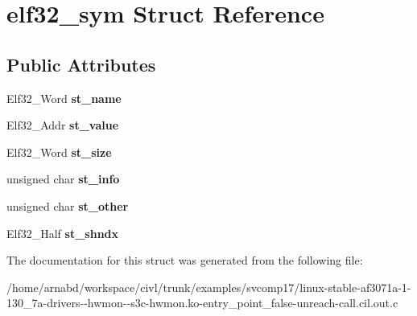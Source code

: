 \hypertarget{structelf32__sym}{}\section{elf32\+\_\+sym Struct Reference}
\label{structelf32__sym}
\subsection*{Public Attributes}
\begin{DoxyCompactItemize}
\item 
\hypertarget{structelf32__sym_a3af4f5f1ead2aefe753e2709ef5218ed}{}Elf32\+\_\+\+Word {\bfseries st\+\_\+name}\label{structelf32__sym_a3af4f5f1ead2aefe753e2709ef5218ed}

\item 
\hypertarget{structelf32__sym_a771991aa716c74feba9c69488c070bbf}{}Elf32\+\_\+\+Addr {\bfseries st\+\_\+value}\label{structelf32__sym_a771991aa716c74feba9c69488c070bbf}

\item 
\hypertarget{structelf32__sym_a66acd8552b9f5782b2cd1e6376d39ff2}{}Elf32\+\_\+\+Word {\bfseries st\+\_\+size}\label{structelf32__sym_a66acd8552b9f5782b2cd1e6376d39ff2}

\item 
\hypertarget{structelf32__sym_aeef86f71df370cf183e2d03afe4d8812}{}unsigned char {\bfseries st\+\_\+info}\label{structelf32__sym_aeef86f71df370cf183e2d03afe4d8812}

\item 
\hypertarget{structelf32__sym_a5ce8408912eda365e2e3246f81f98360}{}unsigned char {\bfseries st\+\_\+other}\label{structelf32__sym_a5ce8408912eda365e2e3246f81f98360}

\item 
\hypertarget{structelf32__sym_a63d4b5123f6be0b2556e3388ed36a336}{}Elf32\+\_\+\+Half {\bfseries st\+\_\+shndx}\label{structelf32__sym_a63d4b5123f6be0b2556e3388ed36a336}

\end{DoxyCompactItemize}


The documentation for this struct was generated from the following file\+:\begin{DoxyCompactItemize}
\item 
/home/arnabd/workspace/civl/trunk/examples/svcomp17/linux-\/stable-\/af3071a-\/1-\/130\+\_\+7a-\/drivers-\/-\/hwmon-\/-\/s3c-\/hwmon.\+ko-\/entry\+\_\+point\+\_\+false-\/unreach-\/call.\+cil.\+out.\+c\end{DoxyCompactItemize}
